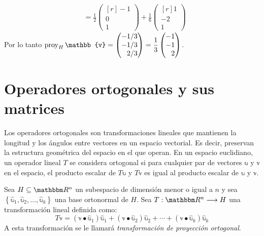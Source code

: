 \begin{example}
\begin{align*}
        & = \frac{1}{2} \begin{pmatrix*}[r]
            -1 \\
            0 \\
            1
        \end{pmatrix*} + \frac{1}{6} \begin{pmatrix*}[r]
            1 \\
            -2 \\
            1
        \end{pmatrix*}
    \end{align*}
    Por lo tanto $\proy_H \mathbb{v} = \begin{pmatrix*}[r]
        -1/3 \\
        -1/3 \\
        2/3
    \end{pmatrix*} = \dfrac{1}{3} \begin{pmatrix*}[r]
        -1 \\
        -1 \\
        2
    \end{pmatrix*}$.
\end{example}

\section{Operadores ortogonales y sus matrices}

Los operadores ortogonales son transformaciones lineales que mantienen la longitud y los ángulos entre vectores en un espacio vectorial. Es decir, preservan la estructura geométrica del espacio en el que operan. En un espacio euclidiano, un operador lineal \( T \) se considera ortogonal si para cualquier par de vectores \( \mathbb{u} \) y \( \mathbb{v} \) en el espacio, el producto escalar de \( T\mathbb{u} \) y \( T\mathbb{v} \) es igual al producto escalar de \( \mathbb{u} \) y \( \mathbb{v} \).

\begin{definition}
    Sea $H \subseteq \RR[n]$ un subespacio de dimensión menor o igual a $n$ y sea $\left\{ \hat{\mathbb{u}}_1, \hat{\mathbb{u}}_2, \dots, \hat{\mathbb{u}}_k \right\}$ una base ortonormal de $H$. Sea $T: \RR[n] \longrightarrow H$ una transformación lineal definida como:
    $$T\mathbb{v} = (\mathbb{v} \bullet \hat{\mathbb{u}}_1)\hat{\mathbb{u}}_1 + (\mathbb{v} \bullet \hat{\mathbb{u}}_2)\hat{\mathbb{u}}_2 + \cdots + (\mathbb{v} \bullet \hat{\mathbb{u}}_k)\hat{\mathbb{u}}_k$$
    A esta transformación se le llamará \emph{transformación de proyección ortogonal}.
\end{definition}

